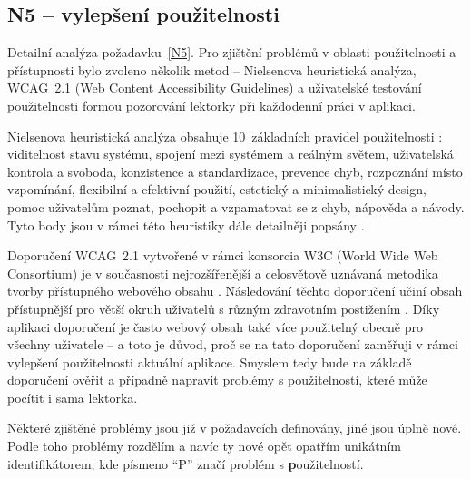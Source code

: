 \subsection{N5 -- vylepšení použitelnosti}\label{subsec:N5detail}

Detailní analýza požadavku~\ref{N5}.
Pro zjištění problémů v oblasti použitelnosti a přístupnosti bylo zvoleno několik metod -- Nielsenova heuristická analýza, WCAG~2.1 (Web Content Accessibility Guidelines) a uživatelské testování použitelnosti formou pozorování lektorky při každodenní práci v aplikaci. 

Nielsenova heuristická analýza obsahuje 10~základních pravidel použitelnosti \cite{nielson}: viditelnost stavu systému, spojení mezi systémem a reálným světem, uživatelská kontrola a svoboda, konzistence a standardizace, prevence chyb, rozpoznání místo vzpomínání, flexibilní a efektivní použití, estetický a minimalistický design, pomoc uživatelům poznat, pochopit a vzpamatovat se z chyb, nápověda a návody. Tyto body jsou v rámci této heuristiky dále detailněji popsány \cite{nielson}.

Doporučení WCAG~2.1 vytvořené v rámci konsorcia W3C (World Wide Web Consortium) je v současnosti nejrozšířenější a celosvětově uznávaná metodika tvorby přístupného webového obsahu \cite{wcag-zdrojak}. Následování těchto doporučení učiní obsah přístupnější pro větší okruh uživatelů s různým zdravotním postižením \cite{wcag}. Díky aplikaci doporučení je často webový obsah také více použitelný obecně pro všechny uživatele \cite{wcag} -- a toto je důvod, proč se na tato doporučení zaměřuji v rámci vylepšení použitelnosti aktuální aplikace. Smyslem tedy bude na základě doporučení ověřit a případně napravit problémy s použitelností, které může pocítit i sama lektorka.

Některé zjištěné problémy jsou již v požadavcích definovány, jiné jsou úplně nové. Podle toho problémy rozdělím a navíc ty nové opět opatřím unikátním identifikátorem, kde písmeno \enquote{P} značí problém s \textbf{p}oužitelností.

